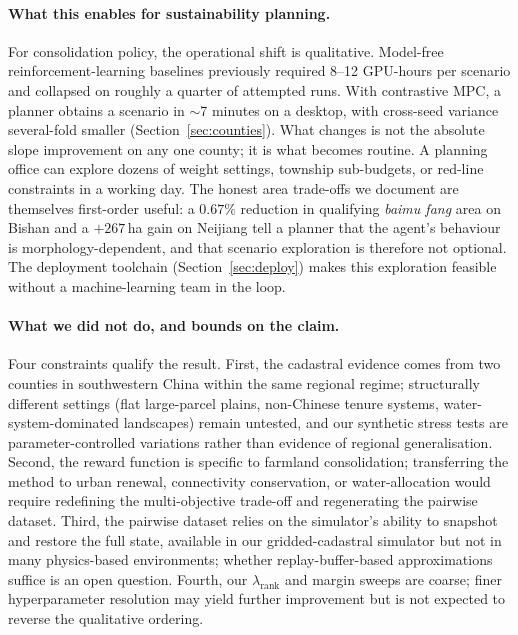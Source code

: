 \documentclass[11pt]{article}
\begin{document}
\paragraph{What this enables for sustainability planning.} For consolidation policy, the operational shift is qualitative. Model-free reinforcement-learning baselines previously required 8--12 GPU-hours per scenario and collapsed on roughly a quarter of attempted runs. With contrastive MPC, a planner obtains a scenario in $\sim$7 minutes on a desktop, with cross-seed variance several-fold smaller (Section~\ref{sec:counties}). What changes is not the absolute slope improvement on any one county; it is what becomes routine. A planning office can explore dozens of weight settings, township sub-budgets, or red-line constraints in a working day. The honest area trade-offs we document are themselves first-order useful: a $0.67\%$ reduction in qualifying \textit{baimu fang} area on Bishan and a $+267$\,ha gain on Neijiang tell a planner that the agent's behaviour is morphology-dependent, and that scenario exploration is therefore not optional. The deployment toolchain (Section~\ref{sec:deploy}) makes this exploration feasible without a machine-learning team in the loop.

\paragraph{What we did not do, and bounds on the claim.} Four constraints qualify the result. First, the cadastral evidence comes from two counties in southwestern China within the same regional regime; structurally different settings (flat large-parcel plains, non-Chinese tenure systems, water-system-dominated landscapes) remain untested, and our synthetic stress tests are parameter-controlled variations rather than evidence of regional generalisation. Second, the reward function is specific to farmland consolidation; transferring the method to urban renewal, connectivity conservation, or water-allocation would require redefining the multi-objective trade-off and regenerating the pairwise dataset. Third, the pairwise dataset relies on the simulator's ability to snapshot and restore the full state, available in our gridded-cadastral simulator but not in many physics-based environments; whether replay-buffer-based approximations suffice is an open question. Fourth, our $\lambda_{\text{rank}}$ and margin sweeps are coarse; finer hyperparameter resolution may yield further improvement but is not expected to reverse the qualitative ordering.
\end{document}
